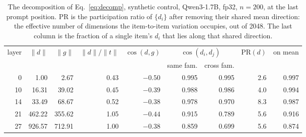 \documentclass{article}
\newcommand{\dvec}{\ensuremath{d}}
\newcommand{\gvec}{\ensuremath{g}}
\newcommand{\tvec}{\ensuremath{t}}
\begin{document}
\begin{table}[h]
\caption{The decomposition of Eq.~\ref{eq:decomp}, synthetic control,
Qwen3-1.7B, fp32, $n=200$, at the last prompt position. $\mathrm{PR}$ is the
participation ratio of $\{\dvec_i\}$ after removing their shared mean direction:
the effective number of dimensions the item-to-item variation occupies, out of
2048. The last column is the fraction of a single item's $\dvec_i$ that lies
along that shared direction.}
\label{tab:geometry-tierA}
\centering
\small
\begin{tabular}{rrrrrrrrr}
\toprule
layer & $\|\dvec\|$ & $\|\gvec\|$ & $\|\dvec\|/\|\tvec\|$ & $\cos(\dvec,\gvec)$
& \multicolumn{2}{c}{$\cos(\dvec_i,\dvec_j)$} & $\mathrm{PR}(\dvec)$ & on mean \\
\cmidrule(lr){6-7}
& & & & & same fam. & cross fam. & & \\
\midrule
 0 &   1.00 &   2.67 & 0.43 & $-0.50$ & 0.995 & 0.995 & 2.6 & 0.997 \\
10 &  16.31 &  39.02 & 0.45 & $-0.39$ & 0.988 & 0.986 & 4.0 & 0.994 \\
14 &  33.49 &  68.67 & 0.52 & $-0.38$ & 0.978 & 0.970 & 8.3 & 0.987 \\
21 & 462.22 & 355.62 & 1.05 & $-0.44$ & 0.915 & 0.789 & 5.6 & 0.916 \\
27 & 926.57 & 712.91 & 1.00 & $-0.38$ & 0.859 & 0.699 & 5.6 & 0.874 \\
\bottomrule
\end{tabular}
\end{table}
\end{document}
